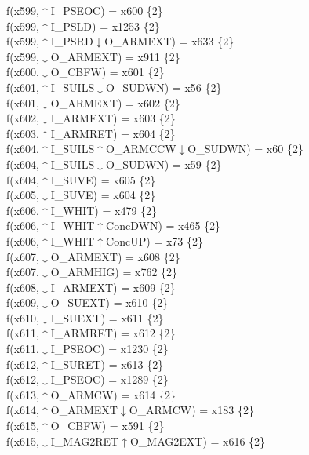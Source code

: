 f(x599,$\uparrow$I\_PSEOC) = x600 \{2\} \\  
f(x599,$\uparrow$I\_PSLD) = x1253 \{2\} \\  
f(x599,$\uparrow$I\_PSRD$\downarrow$O\_ARMEXT) = x633 \{2\} \\  
f(x599,$\downarrow$O\_ARMEXT) = x911 \{2\} \\  
f(x600,$\downarrow$O\_CBFW) = x601 \{2\} \\  
f(x601,$\uparrow$I\_SUILS$\downarrow$O\_SUDWN) = x56 \{2\} \\  
f(x601,$\downarrow$O\_ARMEXT) = x602 \{2\} \\  
f(x602,$\downarrow$I\_ARMEXT) = x603 \{2\} \\  
f(x603,$\uparrow$I\_ARMRET) = x604 \{2\} \\  
f(x604,$\uparrow$I\_SUILS$\uparrow$O\_ARMCCW$\downarrow$O\_SUDWN) = x60 \{2\} \\  
f(x604,$\uparrow$I\_SUILS$\downarrow$O\_SUDWN) = x59 \{2\} \\  
f(x604,$\uparrow$I\_SUVE) = x605 \{2\} \\  
f(x605,$\downarrow$I\_SUVE) = x604 \{2\} \\  
f(x606,$\uparrow$I\_WHIT) = x479 \{2\} \\  
f(x606,$\uparrow$I\_WHIT$\uparrow$ConcDWN) = x465 \{2\} \\  
f(x606,$\uparrow$I\_WHIT$\uparrow$ConcUP) = x73 \{2\} \\  
f(x607,$\downarrow$O\_ARMEXT) = x608 \{2\} \\  
f(x607,$\downarrow$O\_ARMHIG) = x762 \{2\} \\  
f(x608,$\downarrow$I\_ARMEXT) = x609 \{2\} \\  
f(x609,$\downarrow$O\_SUEXT) = x610 \{2\} \\  
f(x610,$\downarrow$I\_SUEXT) = x611 \{2\} \\  
f(x611,$\uparrow$I\_ARMRET) = x612 \{2\} \\  
f(x611,$\downarrow$I\_PSEOC) = x1230 \{2\} \\  
f(x612,$\uparrow$I\_SURET) = x613 \{2\} \\  
f(x612,$\downarrow$I\_PSEOC) = x1289 \{2\} \\  
f(x613,$\uparrow$O\_ARMCW) = x614 \{2\} \\  
f(x614,$\uparrow$O\_ARMEXT$\downarrow$O\_ARMCW) = x183 \{2\} \\  
f(x615,$\uparrow$O\_CBFW) = x591 \{2\} \\  
f(x615,$\downarrow$I\_MAG2RET$\uparrow$O\_MAG2EXT) = x616 \{2\} \\  
